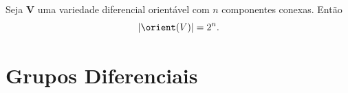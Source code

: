\begin{prop}
Seja $\bm V$ uma variedade diferencial orientável com $n$ componentes conexas. Então
	\begin{equation*}
	\card{\orient(V)} = 2^n.
	\end{equation*}
\end{prop}

\cleardoublepage

\section{Grupos Diferenciais}


